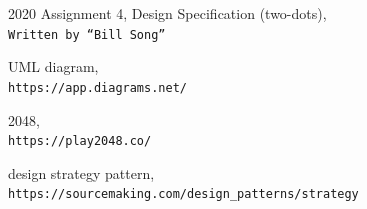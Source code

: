 \documentclass[12pt]{article}
\begin{document}
\bigskip

\newpage
\clearpage
\begin{thebibliography}{9}
2020 Assignment 4, Design Specification (two-dots),\\
\texttt{Written by ``Bill Song''}

UML diagram,\\
\texttt{https://app.diagrams.net/}

2048,\\
\texttt{https://play2048.co/}

design strategy pattern,\\
\texttt{https://sourcemaking.com/design\_patterns/strategy}
\end{thebibliography}
\end{document}

